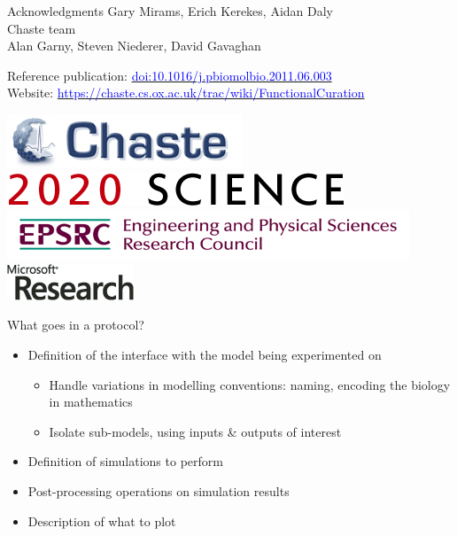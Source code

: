 \documentclass[t,xcolor={usenames,dvipsnames}]{beamer}
\newcommand{\myhref}[2]{\href{#1}{\textcolor{Blue}{#2}}}
\newcommand{\myurl}[1]{\myhref{#1}{#1}}
\newcommand{\doi}[1]{\myhref{http://dx.doi.org/#1}{doi:#1}}
\begin{document}
\begin{frame}{Acknowledgments}
Gary Mirams, Erich Kerekes, Aidan Daly\\
Chaste team\\
Alan Garny, Steven Niederer, David Gavaghan

Reference publication: \doi{10.1016/j.pbiomolbio.2011.06.003}\\
Website: \myurl{https://chaste.cs.ox.ac.uk/trac/wiki/FunctionalCuration}

\begin{center}
\includegraphics[scale=.9]{chaste-266x60}\\ \vspace{.3cm}
\includegraphics[scale=.7]{logo2020science}\\ \vspace{.4cm}
\includegraphics[width=.55\textwidth]{EPSRC1RGBLO} \hspace{.1cm}
\includegraphics[scale=.55]{logo_msr}
\end{center}
\end{frame}


\appendix

\begin{frame}{What goes in a protocol?}
\begin{itemize}
\item Definition of the interface with the model being experimented on
  \begin{itemize}
  \item Handle variations in modelling conventions: naming, encoding the biology in mathematics
  \item Isolate sub-models, using inputs \& outputs of interest
  \end{itemize}
\item Definition of simulations to perform
\item Post-processing operations on simulation results
\item Description of what to plot
\end{itemize}
\end{frame}
\end{document}
